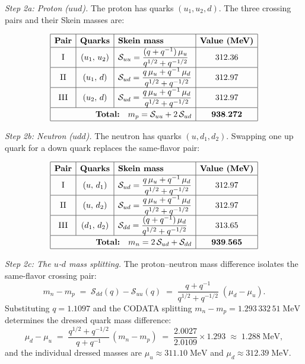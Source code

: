 \begin{proposition}
\emph{Step 2a: Proton ($uud$).}
The proton has quarks $(u_1, u_2, d)$. The three crossing pairs and their
Skein masses are:

$$
\renewcommand{\arraystretch}{1.3}
\begin{array}{|c|c|l|c|}
\hline
\textbf{Pair} & \textbf{Quarks} & \textbf{Skein mass}
  & \textbf{Value (MeV)} \\ \hline
\text{I}   & (u_1,\, u_2) &
  \displaystyle \mathcal{S}_{uu}
  = \frac{(q + q^{-1})\,\mu_u}{q^{1/2}+q^{-1/2}}
  & 312.36 \\ \hline
\text{II}  & (u_1,\, d)   &
  \displaystyle \mathcal{S}_{ud}
  = \frac{q\,\mu_u + q^{-1}\,\mu_d}{q^{1/2}+q^{-1/2}}
  & 312.97 \\ \hline
\text{III} & (u_2,\, d)   &
  \displaystyle \mathcal{S}_{ud}
  = \frac{q\,\mu_u + q^{-1}\,\mu_d}{q^{1/2}+q^{-1/2}}
  & 312.97 \\ \hline
\multicolumn{3}{|r|}{\textbf{Total:}\quad
  m_p = \mathcal{S}_{uu} + 2\,\mathcal{S}_{ud}}
  & \mathbf{938.272} \\ \hline
\end{array}
$$

\emph{Step 2b: Neutron ($udd$).}
The neutron has quarks $(u, d_1, d_2)$. Swapping one up quark for a down
quark replaces the same-flavor pair:

$$
\renewcommand{\arraystretch}{1.3}
\begin{array}{|c|c|l|c|}
\hline
\textbf{Pair} & \textbf{Quarks} & \textbf{Skein mass}
  & \textbf{Value (MeV)} \\ \hline
\text{I}   & (u,\, d_1) &
  \displaystyle \mathcal{S}_{ud}
  = \frac{q\,\mu_u + q^{-1}\,\mu_d}{q^{1/2}+q^{-1/2}}
  & 312.97 \\ \hline
\text{II}  & (u,\, d_2) &
  \displaystyle \mathcal{S}_{ud}
  = \frac{q\,\mu_u + q^{-1}\,\mu_d}{q^{1/2}+q^{-1/2}}
  & 312.97 \\ \hline
\text{III} & (d_1,\, d_2) &
  \displaystyle \mathcal{S}_{dd}
  = \frac{(q + q^{-1})\,\mu_d}{q^{1/2}+q^{-1/2}}
  & 313.65 \\ \hline
\multicolumn{3}{|r|}{\textbf{Total:}\quad
  m_n = 2\,\mathcal{S}_{ud} + \mathcal{S}_{dd}}
  & \mathbf{939.565} \\ \hline
\end{array}
$$

\emph{Step 2c: The $u$-$d$ mass splitting.}
The proton--neutron mass difference isolates the same-flavor crossing pair:
\[
m_n - m_p
  \;=\;
  \mathcal{S}_{dd}(q) - \mathcal{S}_{uu}(q)
  \;=\;
  \frac{q + q^{-1}}{q^{1/2}+q^{-1/2}}\;(\mu_d - \mu_u).
\]
Substituting $q = 1.1097$ and the CODATA splitting
$m_n - m_p = 1.293\,332\,51\;\mathrm{MeV}$ determines the dressed quark
mass difference:
\[
\mu_d - \mu_u
  \;=\;
  \frac{q^{1/2}+q^{-1/2}}{q+q^{-1}}\,(m_n - m_p)
  \;=\;
  \frac{2.0027}{2.0109} \times 1.293
  \;\approx\; 1.288\;\mathrm{MeV},
\]
and the individual dressed masses are
$\mu_u \approx 311.10\;\mathrm{MeV}$ and
$\mu_d \approx 312.39\;\mathrm{MeV}$.


\end{proposition}
